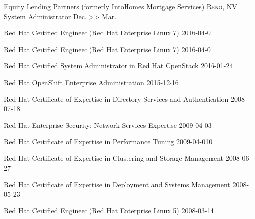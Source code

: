 \documentclass[]{shawnlower-cv}
\begin{document}
\headedsection  %
  {Equity Lending Partners (formerly IntoHomes Mortgage Services)}
  {\textsc{Reno, NV}} {%
  \headedsubsection
    {System Administrator}
    {Dec.  >> Mar. }
    {}
}



\headedsection  %
  {Red Hat Certified Engineer (Red Hat Enterprise Linux 7)}
  {2016-04-01}
  {}

\headedsection
    {Red Hat Certified Engineer (Red Hat Enterprise Linux 7)}
    {2016-04-01}
    {}

\headedsection
    {Red Hat Certified System Administrator in Red Hat OpenStack}
    {2016-01-24}
    {}

\headedsection
    {Red Hat OpenShift Enterprise Administration}
    {2015-12-16}
    {}

\headedsection
    {Red Hat Certificate of Expertise in Directory Services and Authentication}
    {2008-07-18}
    {}

\headedsection
    {Red Hat Enterprise Security: Network Services Expertise}
    {2009-04-03}
    {}

\headedsection
    {Red Hat Certificate of Expertise in Performance Tuning}
    {2009-04-010}
    {}

\headedsection
    {Red Hat Certificate of Expertise in Clustering and Storage Management}
    {2008-06-27}
    {}

\headedsection
    {Red Hat Certificate of Expertise in Deployment and Systems Management}
    {2008-05-23}
    {}

\headedsection
    {Red Hat Certified Engineer (Red Hat Enterprise Linux 5)}
    {2008-03-14}
    {}

\end{document}
